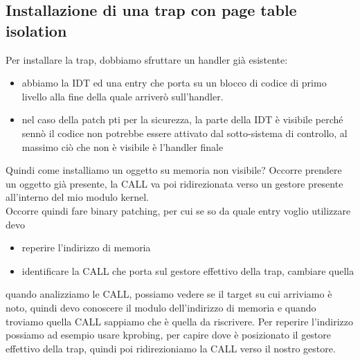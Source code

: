 \documentclass[12pt, oneside]{extbook}
\begin{document}
\subsection{Installazione di una trap con page table isolation}
Per installare la trap, dobbiamo sfruttare un handler già esistente:
\begin{itemize}
\item abbiamo la IDT ed una entry che porta su un blocco di codice di primo livello alla fine della quale arriverò sull'handler.
\item nel caso della patch pti per la sicurezza, la parte della IDT è visibile perché sennò il codice non potrebbe essere attivato dal sotto-sistema di controllo, al massimo ciò che non è visibile è l'handler finale
\end{itemize} 
Quindi come installiamo un oggetto su memoria non visibile? Occorre prendere un oggetto già presente, la CALL va poi ridirezionata verso un gestore presente all'interno del mio modulo kernel.\\Occorre quindi fare binary patching, per cui se so da quale entry voglio utilizzare devo
\begin{itemize}
\item reperire l'indirizzo di memoria
\item identificare la CALL che porta sul gestore effettivo della trap, cambiare quella
\end{itemize}
quando analizziamo le CALL, possiamo vedere se il target su cui arriviamo è noto, quindi devo conoscere il modulo dell'indirizzo di memoria e quando troviamo quella CALL sappiamo che è quella da riscrivere. Per reperire l'indirizzo possiamo ad esempio usare kprobing, per capire dove è posizionato il gestore effettivo della trap, quindi poi ridirezioniamo la CALL verso il nostro gestore.
\end{document}
